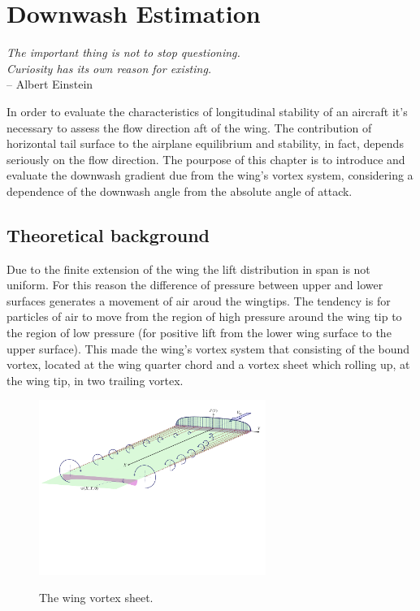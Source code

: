 \chapter{Downwash Estimation}
\label{ch:workobject}

\begin{flushright}
	{\smaller
		\textit{The important thing is not to stop questioning.\\  Curiosity has its own reason for existing.}\\
		-- Albert Einstein}
\end{flushright}

In order to evaluate the characteristics of longitudinal stability of an aircraft it's necessary to assess the flow direction aft of the wing. The contribution of horizontal tail surface to the airplane equilibrium and stability, in fact, depends seriously on the flow direction. The pourpose of this chapter is to introduce and evaluate the downwash gradient due from the wing's vortex system, considering a dependence of the downwash angle from the absolute angle of attack. 

\section{Theoretical background}

Due to the finite extension of the wing the lift distribution in span is not uniform. For this reason the difference of pressure between upper and lower surfaces generates a movement of air aroud the wingtips. The tendency is for particles of air to move from the region of high pressure around the wing tip to the region of low pressure (for positive lift from the lower wing surface to the upper surface). This made the wing's vortex system that consisting of the bound vortex, located at the wing quarter chord and a vortex sheet which rolling up, at the wing tip, in two trailing vortex.\cite{PerkinsHage} \cite{Jacobs:NACA:Rep:648} \\ 


\begin{figure}[H]
\centering
{\includegraphics[height=5.7cm]{Immagini/wing_vortex_sheet3.pdf}} 
\caption{The wing vortex sheet.}
\end{figure}

